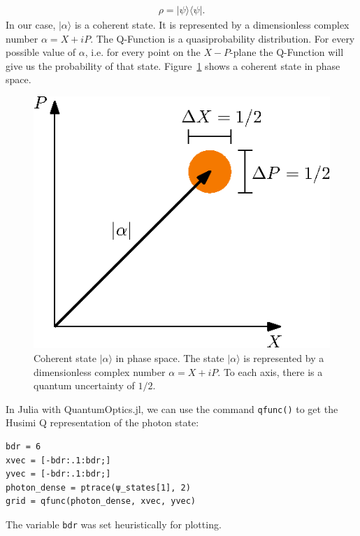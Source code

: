 \begin{align}
\rho = |\psi \rangle \langle \psi |.
\end{align}In our case, $| \alpha \rangle$ is a coherent state. It is represented by a dimensionless complex number $\alpha = X + i P$. The Q-Function is a quasiprobability distribution. For every possible value of $\alpha$, i.e. for every point on the $X-P$-plane the Q-Function will give us the probability of that state. Figure~\ref{coherent_state} shows a coherent state in phase space.

\begin{figure}[!htb]
	\centering
	\includegraphics[width=.4\linewidth]{images/coherent_state.eps}
	\caption{Coherent state $|\alpha \rangle$ in phase space. The state $|\alpha \rangle$ is represented by a dimensionless complex number $\alpha = X + iP$. To each axis, there is a quantum uncertainty of $1/2$.}
	\label{coherent_state}
\end{figure}
\FloatBarrier

\noindent In Julia with QuantumOptics.jl, we can use the command \texttt{qfunc()} to get the Husimi Q representation of the photon state:

\begin{lstlisting}
bdr = 6
xvec = [-bdr:.1:bdr;]
yvec = [-bdr:.1:bdr;]
photon_dense = ptrace(ψ_states[1], 2)
grid = qfunc(photon_dense, xvec, yvec)
\end{lstlisting}The variable \texttt{bdr} was set heuristically for plotting.